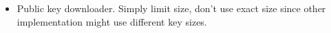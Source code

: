 \begin{itemize}
\begin{itemize}
    \end{itemize}
    
    \item Public key downloader. Simply limit size, don't use exact size since other implementation might use different key sizes.
    
    \end{itemize}
    